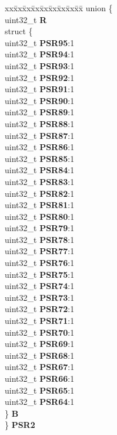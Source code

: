 \begin{DoxyCompactItemize}
\begin{tabbing}
\end{tabbing}\item 
\mbox{\label{structADC__tag_a13712aff4296698a3f146297a3f00644}} 
\begin{tabbing}
xx\=xx\=xx\=xx\=xx\=xx\=xx\=xx\=xx\=\kill
union \{\\
\>uint32\_t {\bfseries R}\\
\>struct \{\\
\>\>uint32\_t {\bfseries PSR95}:1\\
\>\>uint32\_t {\bfseries PSR94}:1\\
\>\>uint32\_t {\bfseries PSR93}:1\\
\>\>uint32\_t {\bfseries PSR92}:1\\
\>\>uint32\_t {\bfseries PSR91}:1\\
\>\>uint32\_t {\bfseries PSR90}:1\\
\>\>uint32\_t {\bfseries PSR89}:1\\
\>\>uint32\_t {\bfseries PSR88}:1\\
\>\>uint32\_t {\bfseries PSR87}:1\\
\>\>uint32\_t {\bfseries PSR86}:1\\
\>\>uint32\_t {\bfseries PSR85}:1\\
\>\>uint32\_t {\bfseries PSR84}:1\\
\>\>uint32\_t {\bfseries PSR83}:1\\
\>\>uint32\_t {\bfseries PSR82}:1\\
\>\>uint32\_t {\bfseries PSR81}:1\\
\>\>uint32\_t {\bfseries PSR80}:1\\
\>\>uint32\_t {\bfseries PSR79}:1\\
\>\>uint32\_t {\bfseries PSR78}:1\\
\>\>uint32\_t {\bfseries PSR77}:1\\
\>\>uint32\_t {\bfseries PSR76}:1\\
\>\>uint32\_t {\bfseries PSR75}:1\\
\>\>uint32\_t {\bfseries PSR74}:1\\
\>\>uint32\_t {\bfseries PSR73}:1\\
\>\>uint32\_t {\bfseries PSR72}:1\\
\>\>uint32\_t {\bfseries PSR71}:1\\
\>\>uint32\_t {\bfseries PSR70}:1\\
\>\>uint32\_t {\bfseries PSR69}:1\\
\>\>uint32\_t {\bfseries PSR68}:1\\
\>\>uint32\_t {\bfseries PSR67}:1\\
\>\>uint32\_t {\bfseries PSR66}:1\\
\>\>uint32\_t {\bfseries PSR65}:1\\
\>\>uint32\_t {\bfseries PSR64}:1\\
\>\} {\bfseries B}\\
\} {\bfseries PSR2}\\


\end{tabbing}
\end{DoxyCompactItemize}
